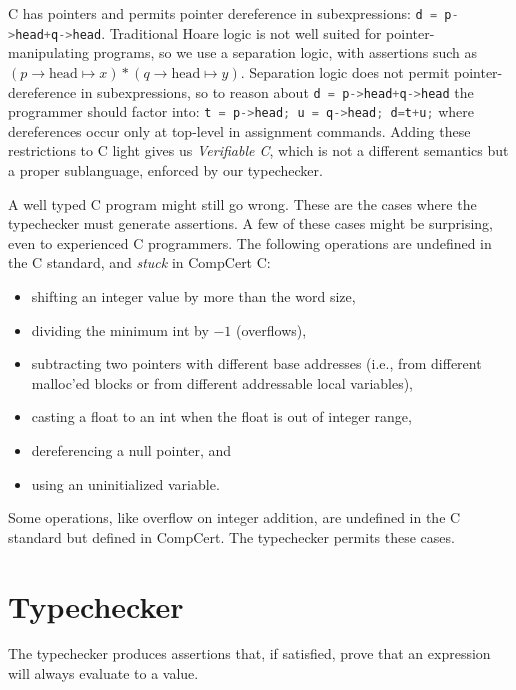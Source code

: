 \documentclass{puthesis}
\begin{document}
C has pointers and permits pointer dereference in subexpressions: \newline
\lstinline[language=C]|d = p->head+q->head|.
Traditional Hoare logic is not well suited for pointer-manipulating programs,
so we use a separation logic, with assertions such as 
$(p\!\!\rightarrow \! \! \mathrm{head} \mapsto x) *(q \!\! \rightarrow \! \!
\mathrm{head} \mapsto y)$. Separation logic does not permit pointer-dereference
in subexpressions, so to reason about 
\lstinline[language=C]|d = p->head+q->head| 
the programmer should factor into:
\lstinline[language=c]|t = p->head; u = q->head; d=t+u;|
where dereferences occur only at top-level in assignment commands.
Adding these restrictions to C light gives us \emph{Verifiable C}, which is not
a different semantics but a proper sublanguage, enforced by our typechecker.

A well typed C program might still go wrong. These are the cases where the
typechecker must generate assertions. A few of these cases might be surprising,
even to experienced C programmers.
The following operations are undefined in the C standard,
and \emph{stuck} in CompCert C:
\begin {itemize}
  \item shifting an integer value by more than the word size,
  \item dividing the minimum int by $-1$  (overflows),
  \item subtracting two pointers with different base addresses (i.e.,
from different malloc'ed blocks or from different addressable local
variables),
  \item casting a float to an int when the float is out of integer range,
  \item dereferencing a null pointer, and
  \item using an uninitialized variable.
\end{itemize}

Some operations, like overflow on integer addition, are undefined in the C standard but defined in
CompCert. The typechecker permits these cases.

\section{Typechecker} 
\label{sec:typechecker}
The typechecker produces assertions that, if satisfied, prove that an
expression will always evaluate to a value.  
\end{document}
